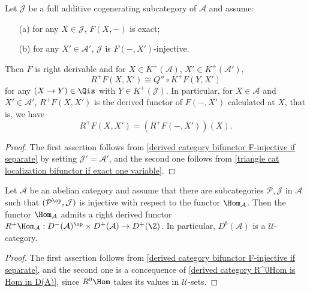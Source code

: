 \begin{corollary}\label{derived category bifunctor localization if exact one variable}
Let $\mathcal{J}$ be a full additive cogenerating subcategory of $\mathcal{A}$ and assume:
\begin{enumerate}
    \item[(a)] for any $X\in\mathcal{J}$, $F(X,-)$ is exact;
    \item[(b)] for any $X'\in\mathcal{A}'$, $\mathcal{J}$ is $F(-,X')$-injective.
\end{enumerate}
Then $F$ is right derivable and for $X\in K^+(\mathcal{A})$, $X'\in K^+(\mathcal{A}')$,
\[R^+F(X,X')\cong Q''\circ K^+F(Y,X')\]
for any $(X\to Y)\in\Qis$ with $Y\in K^+(\mathcal{J})$. In particular, for $X\in\mathcal{A}$ and $X'\in\mathcal{A}'$, $R^+F(X,X')$ is the derived functor of $F(-,X')$ calculated at $X$, that is, we have
\[R^+F(X,X')=(R^+F(-,X'))(X).\]
\end{corollary}
\begin{proof}
The first assertion follows from \cref{derived category bifunctor F-injective if separate} by setting $\mathcal{J}'=\mathcal{A}'$, and the second one follows from \cref{triangle cat localization bifunctor if exact one variable}.
\end{proof}

\begin{corollary}\label{derived category bounded RHom exists if}
Let $\mathcal{A}$ be an abelian category and assume that there are subcategories $\mathcal{P},\mathcal{J}$ in $\mathcal{A}$ such that $(\mathcal{P}^{\op},\mathcal{J})$ is injective with respect to the functor $\Hom_\mathcal{A}$. Then the functor $\Hom_\mathcal{A}$ admits a right derived functor $R^+\Hom_\mathcal{A}:D^-(\mathcal{A})^{\op}\times D^+(\mathcal{A})\to D^+(\Z)$. In particular, $D^b(\mathcal{A})$ is a $\mathscr{U}$-category.
\end{corollary}
\begin{proof}
The first assertion follows from \cref{derived category bifunctor F-injective if separate}, and the second one is a concequence of \cref{derived category R^0Hom is Hom in D(A)}, since $R^0\Hom$ takes its values in $\mathscr{U}$-sets.
\end{proof}

